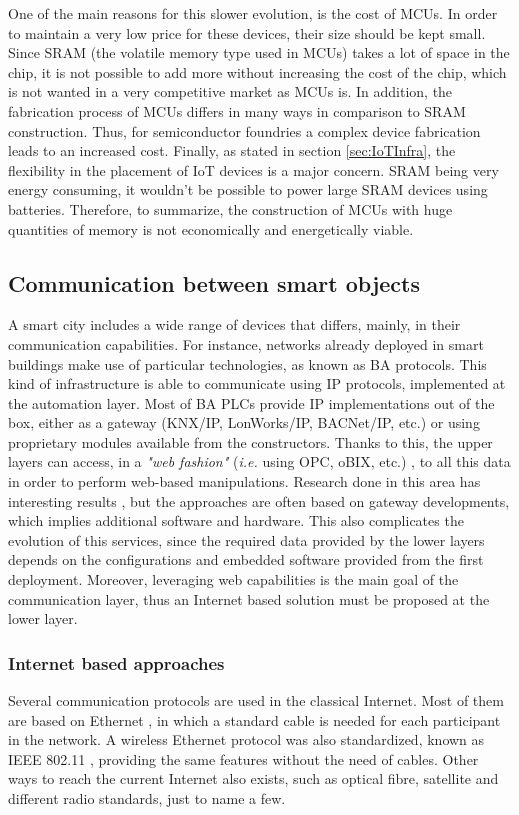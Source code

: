 One of the main reasons for this slower evolution, is the cost of MCUs.
In order to maintain a very low price for these devices, their size should be kept small.
Since SRAM (the volatile memory type used in MCUs) takes a lot of space in the chip, it is not possible to add more without increasing the cost of the chip, which is not wanted in a very competitive market as MCUs is.
In addition, the fabrication process of MCUs differs in many ways in comparison to SRAM construction.
Thus, for semiconductor foundries a complex device fabrication leads to an increased cost.
Finally, as stated in section \ref{sec:IoTInfra}, the flexibility in the placement of IoT devices is a major concern.
SRAM being very energy consuming, it wouldn't be possible to power large SRAM devices using batteries.
Therefore, to summarize, the construction of MCUs with huge quantities of memory is not economically and energetically viable.

\subsection{Communication between smart objects}
A smart city includes a wide range of devices that differs, mainly, in their communication capabilities.
For instance, networks already deployed in smart buildings make use of particular technologies, as known as BA protocols.
This kind of infrastructure is able to communicate using IP protocols, implemented at the automation layer.
Most of BA PLCs provide IP implementations out of the box, either as a gateway (KNX/IP, LonWorks/IP, BACNet/IP, etc.) \cite{kastner2005commbas} or using proprietary modules available from the constructors.
Thanks to this, the upper layers can access, in a \textit{"web fashion"} (\textit{i.e.} using OPC, oBIX, etc.) \cite{neugschwandtner2007knxtoobix}, to all this data in order to perform web-based manipulations.
Research done in this area has interesting results \cite{jung2013bainsmartcities}, but the approaches are often based on gateway developments, which implies additional software and hardware.
This also complicates the evolution of this services, since the required data provided by the lower layers depends on the configurations and embedded software provided from the first deployment.
Moreover, leveraging web capabilities is the main goal of the communication layer, thus an Internet based solution must be proposed at the lower layer.

\subsubsection{Internet based approaches}
Several communication protocols are used in the classical Internet.
Most of them are based on Ethernet \cite{ieee802.3}, in which a standard cable is needed for each participant in the network.
A wireless Ethernet protocol was also standardized, known as IEEE 802.11 \cite{ieee802.11}, providing the same features without the need of cables.
Other ways to reach the current Internet also exists, such as optical fibre, satellite and different radio standards, just to name a few.

